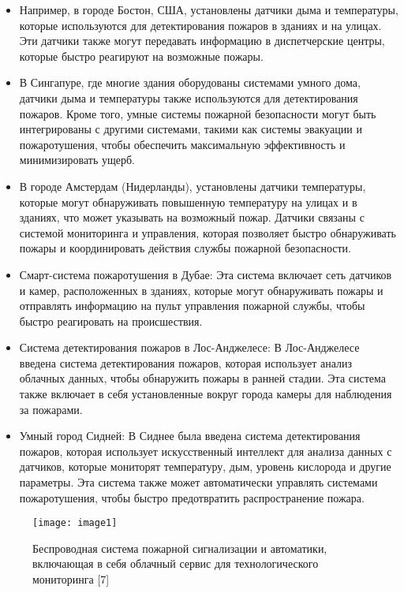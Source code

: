 \begin{multicols}{2}
\begin{itemize}
\item
  Например, в городе Бостон, США, установлены датчики дыма и
  температуры, которые используются для детектирования пожаров в зданиях
  и на улицах. Эти датчики также могут передавать информацию в
  диспетчерские центры, которые быстро реагируют на возможные пожары.
\item
  В Сингапуре, где многие здания оборудованы системами умного дома,
  датчики дыма и температуры также используются для детектирования
  пожаров. Кроме того, умные системы пожарной безопасности могут быть
  интегрированы с другими системами, такими как системы эвакуации и
  пожаротушения, чтобы обеспечить максимальную эффективность и
  минимизировать ущерб.
\item
  В городе Амстердам (Нидерланды), установлены датчики температуры,
  которые могут обнаруживать повышенную температуру на улицах и в
  зданиях, что может указывать на возможный пожар. Датчики связаны с
  системой мониторинга и управления, которая позволяет быстро
  обнаруживать пожары и координировать действия службы пожарной
  безопасности.
\item
  Смарт-система пожаротушения в Дубае: Эта система включает сеть
  датчиков и камер, расположенных в зданиях, которые могут обнаруживать
  пожары и отправлять информацию на пульт управления пожарной службы,
  чтобы быстро реагировать на происшествия.
\item
  Система детектирования пожаров в Лос-Анджелесе: В Лос-Анджелесе
  введена система детектирования пожаров, которая использует анализ
  облачных данных, чтобы обнаружить пожары в ранней стадии. Эта система
  также включает в себя установленные вокруг города камеры для
  наблюдения за пожарами.
\item
  Умный город Сидней: В Сиднее была введена система детектирования
  пожаров, которая использует искусственный интеллект для анализа данных
  с датчиков, которые мониторят температуру, дым, уровень кислорода и
  другие параметры. Эта система также может автоматически управлять
  системами пожаротушения, чтобы быстро предотвратить распространение
  пожара.
\end{itemize}
\end{multicols}

\begin{figure}[H]
  \centering
  \texttt{[image: image1]}
  \caption{Беспроводная система пожарной сигнализации и автоматики,
  включающая в себя облачный сервис для технологического мониторинга
  {[}7{]}}
\end{figure}

